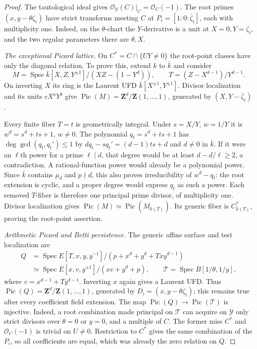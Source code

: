 \documentclass[11pt,a4paper]{article}
\theoremstyle{remark}
\newcommand{\Z}{\mathbf Z}
\newcommand{\Spec}{\operatorname{Spec}}
\newcommand{\Pic}{\operatorname{Pic}}
\begin{document}
\begin{proof}
The tautological ideal gives
$\mathcal O_{\mathcal Y}(C)|_C=\mathcal O_C(-1)$.
The root primes $(x,y-\theta\zeta_i)$ have strict transforms
meeting $C$ at $P_i=[1:0:\bar\zeta_i]$, each with multiplicity
one. Indeed, on the $\theta$-chart the $Y$-derivative is a unit
at $X=0,Y=\zeta_i$, and the two regular parameters there are
$\theta,X$.

\emph{The exceptional Picard lattice.}
On $C^*=C\cap\{UY\ne0\}$ the root-point classes have only
the diagonal relation. To prove this, extend $k$ to $\bar k$ and
consider
\[
 M=\Spec\bar k[X,Z,Y^{\pm1}]/(XZ-(1-Y^d)),\qquad
 T=(Z-X^{d-1})/Y^{d-1}.
\]
On inverting $X$ its ring is the Laurent UFD
$\bar k[X^{\pm1},Y^{\pm1}]$. Divisor localization and its units
$cX^aY^b$ give
$\Pic(M)=\Z^d/\Z(1,\ldots,1)$, generated by
$(X,Y-\bar\zeta_i)$.

Every finite fiber $T=t$ is geometrically integral. Under
$s=X/Y$, $w=1/Y$ it is
$w^d=s^d+ts+1$, $w\ne0$.
The polynomial $q_t=s^d+ts+1$ has $\deg\gcd(q_t,q_t')\le1$
by $dq_t-sq_t'=(d-1)ts+d$ and $d\ne0$ in $\bar k$.
If it were an $\ell$th power for a prime $\ell\mid d$,
that degree would be at least $d-d/\ell\ge2$, a contradiction.
A rational-function power would already be a polynomial power.
Since $\bar k$ contains $\mu_d$ and $p\nmid d$, this also
proves irreducibility of $w^d-q_t$: the root extension is
cyclic, and a proper degree would express $q_t$ as such a power.
Each removed $T$-fiber is therefore one principal prime divisor,
of multiplicity one. Divisor localization gives
$\Pic(M)\simeq\Pic(M_{\bar k(T)})$.
Its generic fiber is $C^*_{\bar k(T)}$, proving the root-point
assertion.

\emph{Arithmetic Picard and Betti persistence.}
The generic affine surface and test localization are
\begin{align*}
 Q&=\Spec E[T,x,y,y^{-1}]/(p+x^d+y^d+Txy^{d-1})\\
  &\simeq\Spec E[x,v,y^{\pm1}]/(xv+y^d+p),\qquad
 \mathcal T=\Spec B[1/\theta,1/y],
\end{align*}
where $v=x^{d-1}+Ty^{d-1}$. Inverting $x$ again gives a
Laurent UFD. Thus $\Pic(Q)=\Z^d/\Z(1,\ldots,1)$, generated
by $D_i=(x,y-\theta\zeta_i)$; this remains true after every
coefficient field extension.
The map $\Pic(Q)\to\Pic(\mathcal T)$ is injective.
Indeed, a root combination made principal on $\mathcal T$
can acquire on $\mathcal Y$ only strict divisors over $\theta=0$
or $y=0$, and a multiple of $C$. The former miss $C^*$ and
$\mathcal O_C(-1)$ is trivial on $U\ne0$.
Restriction to $C^*$ gives the same combination of the $P_i$,
so all coefficients are equal, which was already the zero
relation on $Q$.


\end{proof}
\end{document}

